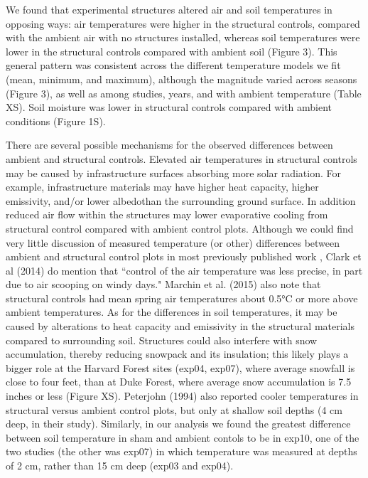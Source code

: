\documentclass{article}
\begin{document}
\par We found that experimental structures altered air and soil temperatures in opposing ways:  air temperatures were higher in the structural controls, compared with the ambient air with no structures installed, whereas soil temperatures were lower in the structural controls compared with ambient soil (Figure 3). This general pattern was consistent across the different temperature models we fit (mean, minimum, and maximum), although the magnitude varied across seasons (Figure 3), as well as among studies, years, and with ambient temperature (Table XS). Soil moisture was lower in structural controls compared with ambient conditions (Figure 1S). 
\par There are several possible mechanisms for the observed differences between ambient and structural controls.  Elevated air temperatures in structural controls may be caused by infrastructure surfaces absorbing more solar radiation. For example, infrastructure materials may have higher heat capacity, higher emissivity, and/or lower albedothan the surrounding ground surface. In addition reduced air flow within the structures may lower evaporative cooling from structural control compared with ambient control plots. Although we could find very little discussion of measured temperature (or other) differences between ambient and structural control plots in most previously published work \citep[e.g.][]{farnsworth1995,pellini2011,clark2014a,clark2014b}, Clark et al (2014) do mention that ``control of the air temperature was less precise, in part due to air scooping on windy days." Marchin et al. (2015) also note that structural controls had mean spring air temperatures about 0.5°C or more above ambient temperatures. As for the differences in soil temperatures, it may be caused by alterations to heat capacity and emissivity in the structural materials compared to surrounding soil. Structures could also interfere with snow accumulation, thereby reducing snowpack and its insulation; this likely plays a bigger role at the Harvard Forest sites (exp04, exp07), where average snowfall is close to four feet, than at Duke Forest, where average snow accumulation is 7.5 inches or less (Figure XS). Peterjohn (1994) also reported cooler temperatures in structural versus ambient control plots, but only at shallow soil depths (4 cm deep, in their study). Similarly, in our analysis we found the greatest difference between soil temperature in sham and ambient contols to be in exp10, one of the two studies (the other was exp07) in which temperature was measured at depths of 2 cm, rather than 15 cm deep (exp03 and exp04). 
\end{document}
